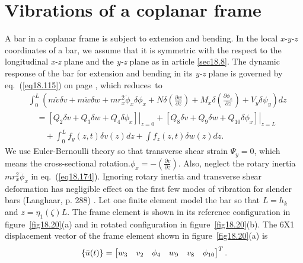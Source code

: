 \documentclass{AeroStructure-ERJohnson}
\begin{document}
\vspace*{-0.8pc}

\setcounter{equation}{173}
\section{Vibrations of a coplanar frame}\label{sec18.9}

A bar in a coplanar frame is subject to extension and bending. In the local \textit{x-y-z} coordinates of a bar, we assume that it is symmetric with the respect to the longitudinal \textit{x-z} plane and the \textit{y-z} plane as in article \ref{sec18.8}. The dynamic response of the bar for extension and bending in its \textit{y-z} plane is governed by eq.~(\ref{eq18.115}) on page \pageref{eq18.115}, which reduces~to
\begin{align}\label{eq18.174}
&\int_{0}^{L}\left(m \ddot{v} \delta v+m \ddot{w} \delta w+m r_{x}^{2} \ddot{\phi}_{x} \delta \phi_{x}+N \delta\left(\frac{\partial w}{\partial z}\right)+M_{x} \delta\left(\frac{\partial \phi_{x}}{\partial z}\right)+V_{y} \delta \psi_{y}\right) d z\nonumber\\
&\quad =\left.\left[Q_{2} \delta v+Q_{3} \delta w+Q_{4} \delta \phi_{x}\right]\right|_{z=0}+\left.\left[Q_{8} \delta v+Q_{9} \delta w+Q_{10} \delta \phi_{x}\right]\right|_{z=L}\nonumber\\
&\qquad +\int_{0}^{L} f_{y}(z, t) \delta v(z) d z+\int f_{z}(z, t) \delta w(z) dz.
\end{align}
We use Euler-Bernoulli theory so that transverse shear strain $\Psi_{y}=0$, which means the cross-sectional rotation$.\phi_{x}=-\left(\frac{\partial v}{\partial z}\right)$. Also, neglect the rotary inertia $m r^2_{x}\ddot{\phi}_x$ in eq.~(\ref{eq18.174}). Ignoring rotary inertia and transverse shear deformation has negligible effect on the first few modes of vibration for slender bars (Langhaar, p. 288) . Let one finite element model the bar so that $L=h_{k}$ and $z=\eta_{1}(\zeta) L$. The frame element is shown in its reference configuration in figure~\ref{fig18.20}(a) and in rotated configuration in figure~\ref{fig18.20}(b). The 6X1 displacement vector of the frame element shown in figure~\ref{fig18.20}(a) is
\begin{align}\label{eq18.175}
\{\bar{u}(t)\}=\left[\begin{array}{@{}llllll@{}}w_{3} & v_{2} & \phi_{4} & w_{9} & v_{8} & \phi_{10}\end{array}\right]^{T}.
\end{align}
\end{document}
